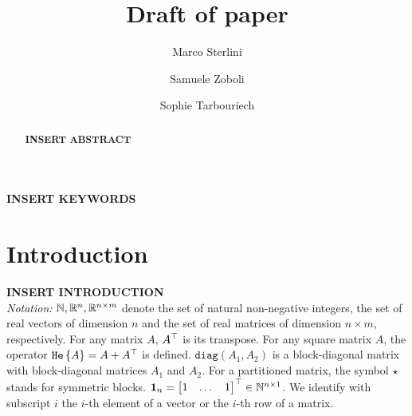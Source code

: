 \documentclass{ifacconf}
\theoremstyle{plain}
\begin{document}
\begin{frontmatter}

\title{Draft of paper}

\author[First]{Marco Sterlini}
\author[Second]{Samuele Zoboli}
\author[Second]{Sophie Tarbouriech}

\address[First]{University di Trento, Trento, Italy (e-mail: marco.sterlini@studenti.unitn.it) }
\address[Second]{LAAS-CNRS, Université de Toulouse, CNRS, Toulouse, France (e-mail:bu) }


\begin{abstract}
\textbf{INSERT ABSTRACT}
\end{abstract}

\begin{keyword}
\textbf{INSERT KEYWORDS}
\end{keyword}

\end{frontmatter}

\section{Introduction}
\textbf{INSERT INTRODUCTION}\\
\emph{Notation:} ${\mathbb{N}}, {\mathbb{R}}^{n}, {\mathbb{R}}^{n \times m}$ denote the set of natural non-negative integers, the set of real vectors of dimension $n$ and the set of real matrices of dimension $n \times m$, respectively. For any matrix $A$, $A^\top$ is its transpose. For any square matrix $A$, the operator $\texttt{\relax{He}}\left\{{ A }\right\} = A + A^\top$ is defined. $\texttt{diag}(A_1, A_2)$ is a block-diagonal matrix with block-diagonal matrices $A_1$ and $A_2$. For a partitioned matrix, the symbol $\star$ stands for symmetric blocks. $\operatorname{\mathbf{1}}_n = \left[\begin{matrix}1 & \dots & 1\end{matrix}\right]^\top \in {\mathbb{N}}^{n \times 1}$. We identify with subscript $i$ the $i$-th element of a vector or the $i$-th row of a matrix.
\end{document}

